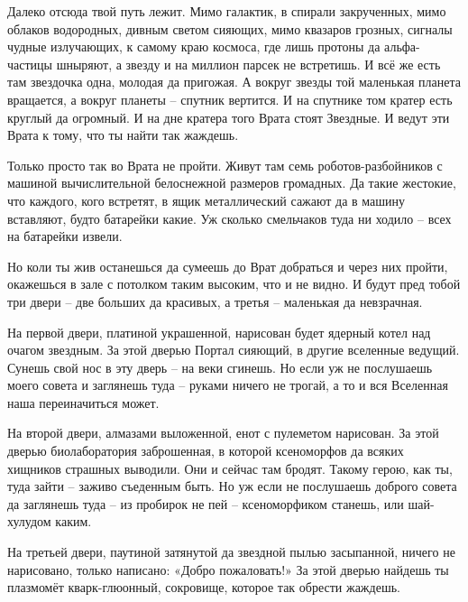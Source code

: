\documentclass[ebook,oneside,final,openright]{memoir}
\begin{document}
\par
Далеко отсюда твой путь лежит. Мимо галактик, в спирали закрученных, мимо облаков водородных, дивным светом сияющих, мимо квазаров грозных, сигналы чудные излучающих, к самому краю космоса, где лишь протоны да альфа-частицы шныряют, а звезду и на миллион парсек не встретишь. И всё же есть там звездочка одна, молодая да пригожая. А вокруг звезды той маленькая планета вращается, а вокруг планеты – спутник вертится. И на спутнике том кратер есть круглый да огромный. И на дне кратера того Врата стоят Звездные. И ведут эти Врата к тому, что ты найти так жаждешь.\par
\par
Только просто так во Врата не пройти. Живут там семь роботов-разбойников с машиной вычислительной белоснежной размеров громадных. Да такие жестокие, что каждого, кого встретят, в ящик металлический сажают да в машину вставляют, будто батарейки какие. Уж сколько смельчаков туда ни ходило – всех на батарейки извели.\par
\par
Но коли ты жив останешься да сумеешь до Врат добраться и через них пройти, окажешься в зале с потолком таким высоким, что и не видно. И будут пред тобой три двери – две больших да красивых, а третья – маленькая да невзрачная.\par
\par
На первой двери, платиной украшенной, нарисован будет ядерный котел над очагом звездным. За этой дверью Портал сияющий, в другие вселенные ведущий. Сунешь свой нос в эту дверь – на веки сгинешь. Но если уж не послушаешь моего совета и заглянешь туда – руками ничего не трогай, а то и вся Вселенная наша переиначиться может.\par
\par
На второй двери, алмазами выложенной, енот с пулеметом нарисован. За этой дверью биолаборатория заброшенная, в которой ксеноморфов да всяких хищников страшных выводили. Они и сейчас там бродят. Такому герою, как ты, туда зайти – заживо съеденным быть. Но уж если не послушаешь доброго совета да заглянешь туда – из пробирок не пей – ксеноморфиком станешь, или шай-хулудом каким.\par
\par
На третьей двери, паутиной затянутой да звездной пылью засыпанной, ничего не нарисовано, только написано: «Добро пожаловать!» За этой дверью найдешь ты плазмомёт кварк-глюонный, сокровище, которое так обрести жаждешь.\par
\par
\end{document}
